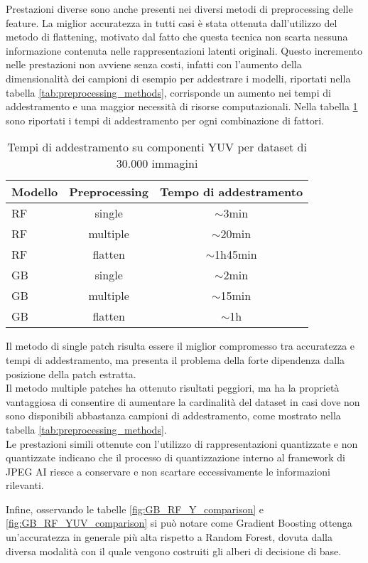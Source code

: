 Prestazioni diverse sono anche presenti nei diversi metodi di preprocessing delle feature. La miglior accuratezza in tutti casi è stata ottenuta dall'utilizzo del metodo di flattening, motivato dal fatto che questa tecnica non scarta nessuna informazione contenuta nelle rappresentazioni latenti originali. Questo incremento nelle prestazioni non avviene senza costi, infatti con l'aumento della dimensionalità dei campioni di esempio per addestrare i modelli, riportati nella tabella \ref{tab:preprocessing_methods}, corrisponde un aumento nei tempi di addestramento e una maggior necessità di risorse computazionali. Nella tabella \ref{tab:training_times} sono riportati i tempi di addestramento per ogni combinazione di fattori.
\begin{table}[H]
\centering
\caption{Tempi di addestramento su componenti YUV per dataset di $30.000$ immagini}\label{tab:training_times}
\begin{tabular}{l c c}
\toprule
Modello & Preprocessing & Tempo di addestramento \\
\midrule
RF &      single &  $\sim$3min \\
RF &    multiple &  $\sim$20min\\
RF &      flatten &  $\sim$1h45min\\
\midrule
GB &      single &  $\sim$2min \\
GB &    multiple &  $\sim$15min \\
GB &      flatten &  $\sim$1h \\
\bottomrule
\end{tabular}
\end{table}
Il metodo di single patch risulta essere il miglior compromesso tra accuratezza e tempi di addestramento, ma presenta il problema della forte dipendenza dalla posizione della patch estratta.\\
Il metodo multiple patches ha ottenuto risultati peggiori, ma ha la proprietà vantaggiosa di consentire di aumentare la cardinalità del dataset in casi dove non sono disponibili abbastanza campioni di addestramento, come mostrato nella tabella \ref{tab:preprocessing_methods}.\\

Le prestazioni simili ottenute con l'utilizzo di rappresentazioni quantizzate e non quantizzate indicano che il processo di quantizzazione interno al framework di JPEG AI riesce a conservare e non scartare eccessivamente le informazioni rilevanti.

Infine, osservando le tabelle \ref{fig:GB_RF_Y_comparison} e \ref{fig:GB_RF_YUV_comparison} si può notare come Gradient Boosting ottenga un'accuratezza in generale più alta rispetto a Random Forest, dovuta dalla diversa modalità con il quale vengono costruiti gli alberi di decisione di base.\\
